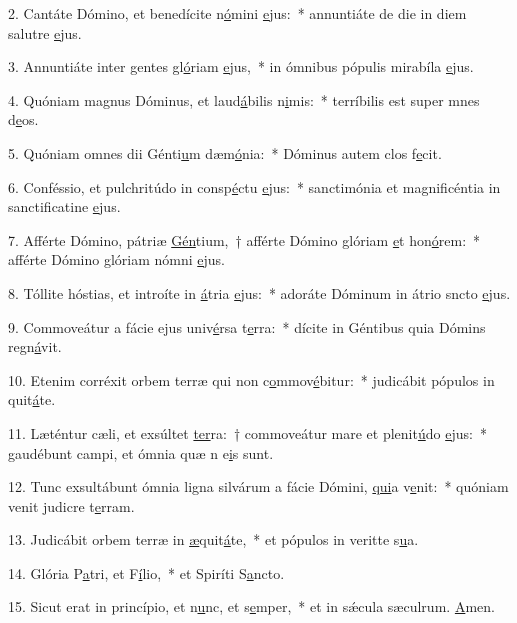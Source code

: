 2. Cantáte Dómino, et benedícite n\uline{ó}mini \uline{e}jus:~* annuntiáte de die in diem salutre \uline{e}jus.\par 
3. Annuntiáte inter gentes gl\uline{ó}riam \uline{e}jus,~* in ómnibus pópulis mirabíla \uline{e}jus.\par 
4. Quóniam magnus Dóminus, et laud\uline{á}bilis n\uline{i}mis:~* terríbilis est super mnes d\uline{e}os.\par 
5. Quóniam omnes dii Génti\uline{u}m dæm\uline{ó}nia:~* Dóminus autem clos f\uline{e}cit.\par 
6. Conféssio, et pulchritúdo in consp\uline{é}ctu \uline{e}jus:~* sanctimónia et magnificéntia in sanctificatine \uline{e}jus.\par 
7. Afférte Dómino, pátriæ \uline{Gén}tium,~† afférte Dómino glóriam \uline{e}t hon\uline{ó}rem:~* afférte Dómino glóriam nómni \uline{e}jus.\par 
8. Tóllite hóstias, et introíte in \uline{á}tria \uline{e}jus:~* adoráte Dóminum in átrio sncto \uline{e}jus.\par 
9. Commoveátur a fácie ejus univ\uline{é}rsa t\uline{e}rra:~* dícite in Géntibus quia Dómins regn\uline{á}vit.\par 
10. Etenim corréxit orbem terræ qui non c\uline{o}mmov\uline{é}bitur:~* judicábit pópulos in quit\uline{á}te.\par 
11. Læténtur cæli, et exsúltet \uline{ter}ra:~† commoveátur mare et plenit\uline{ú}do \uline{e}jus:~* gaudébunt campi, et ómnia quæ n e\uline{i}s sunt.\par 
12. Tunc exsultábunt ómnia ligna silvárum a fácie Dómini, \uline{qui}a v\uline{e}nit:~* quóniam venit judicre t\uline{e}rram.\par 
13. Judicábit orbem terræ in \uline{æ}quit\uline{á}te,~* et pópulos in veritte s\uline{u}a.\par 
14. Glória P\uline{a}tri, et F\uline{í}lio,~* et Spiríti S\uline{a}ncto.\par 
15. Sicut erat in princípio, et n\uline{u}nc, et s\uline{e}mper,~* et in sǽcula sæculrum. \uline{A}men.\par 
